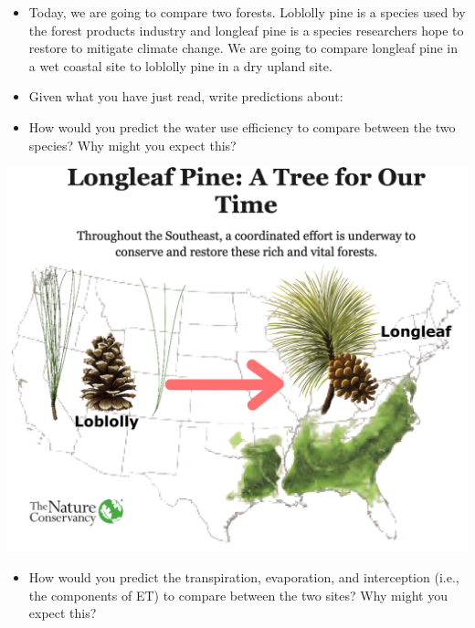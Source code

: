 \documentclass[oneside,a4paper,11pt,explicit]{book}
\begin{document}
\begin{tcolorbox}[colback=yellow!5!white,colframe=IceCreamLeaf,title=\textbf{Hypotheses}]
	\begin{multicols}{2}
	
	\begin{itemize}
		\item Today, we are going to compare two forests. Loblolly pine is a species used by the forest products industry and longleaf pine is a species researchers hope to restore to mitigate climate change. We are going to compare longleaf pine in a wet coastal site to loblolly pine in a dry upland site.
		\item Given what you have just read, write predictions about: 
            \item[1)] How would you predict the water use efficiency to compare between the two species? Why might you expect this? 
	\end{itemize}

 
	\columnbreak

	\centerline{\includegraphics[width=\columnwidth]{SouthernPineIntro.png}}

	\begin{itemize}
              \item[2)] How would you predict the transpiration, evaporation, and interception (i.e., the components of ET) to compare between the two sites? Why might you expect this? 
	\end{itemize}

	\end{multicols}
\end{tcolorbox}
\end{document}

